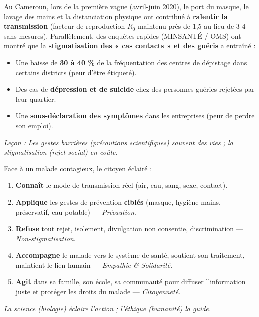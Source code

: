 \documentclass[11pt]{article}
\begin{document}
\begin{exemplebox}
Au Cameroun, lors de la première vague (avril-juin 2020), le port du masque, le lavage des mains et la distanciation physique ont contribué à \textbf{ralentir la transmission} (facteur de reproduction $R_0$ maintenu près de 1,5 au lieu de 3-4 sans mesures). Parallèlement, des enquêtes rapides (MINSANTÉ / OMS) ont montré que la \textbf{stigmatisation des « cas contacts » et des guéris} a entraîné :
\begin{itemize}
    \item Une baisse de \textbf{30 à 40 \%} de la fréquentation des centres de dépistage dans certains districts (peur d'être étiqueté).
    \item Des cas de \textbf{dépression et de suicide} chez des personnes guéries rejetées par leur quartier.
    \item Une \textbf{sous-déclaration des symptômes} dans les entreprises (peur de perdre son emploi).
\end{itemize}
\emph{Leçon : Les gestes barrières (précautions scientifiques) sauvent des vies ; la stigmatisation (rejet social) en coûte.}
\end{exemplebox}

\begin{aretenir}
Face à un malade contagieux, le citoyen éclairé :
\begin{enumerate}
    \item \textbf{Connaît} le mode de transmission réel (air, eau, sang, sexe, contact).
    \item \textbf{Applique} les gestes de prévention \textbf{ciblés} (masque, hygiène mains, préservatif, eau potable) — \emph{Précaution}.
    \item \textbf{Refuse} tout rejet, isolement, divulgation non consentie, discrimination — \emph{Non-stigmatisation}.
    \item \textbf{Accompagne} le malade vers le système de santé, soutient son traitement, maintient le lien humain — \emph{Empathie \& Solidarité}.
    \item \textbf{Agit} dans sa famille, son école, sa communauté pour diffuser l'information juste et protéger les droits du malade — \emph{Citoyenneté}.
\end{enumerate}
\emph{La science (biologie) éclaire l'action ; l'éthique (humanité) la guide.}
\end{aretenir}
\end{document}
